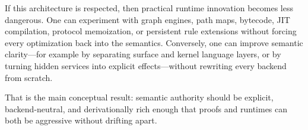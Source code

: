 \documentclass[11pt]{article}
\begin{document}
If this architecture is respected, then practical runtime innovation becomes less dangerous. One can experiment with graph engines, path maps, bytecode, JIT compilation, protocol memoization, or persistent rule extensions without forcing every optimization back into the semantics. Conversely, one can improve semantic clarity---for example by separating surface and kernel language layers, or by turning hidden services into explicit effects---without rewriting every backend from scratch.

That is the main conceptual result: semantic authority should be explicit, backend-neutral, and derivationally rich enough that proofs and runtimes can both be aggressive without drifting apart.
\end{document}
